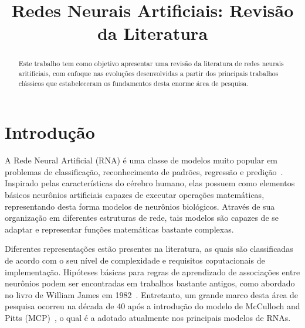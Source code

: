 \documentclass[conference]{IEEEtran}
\begin{document}
	
	\title{Redes Neurais Artificiais: Revisão da Literatura}
	
	
	\author{
		}
	
	
	
	\maketitle
	
	\begin{abstract}
		Este trabalho tem como objetivo apresentar uma revisão da literatura de redes neurais aritificiais, com enfoque nas evoluções desenvolvidas a partir dos principais trabalhos clássicos que estabeleceram os fundamentos desta enorme área de pesquisa. 
	\end{abstract}

	\section{Introdução}
	A Rede Neural Artificial (RNA) é uma classe de modelos muito popular em problemas de classificação, reconhecimento de padrões, regressão e predição~\cite{jain1996artificial}. Inspirado pelas características do cérebro humano, elas possuem como elementos básicos neurônios artificiais capazes de executar operações matemáticas, representando desta forma modelos de neurônios biológicos. Através de sua organização em diferentes estruturas de rede, tais modelos são capazes de se adaptar e representar funções matemáticas bastante complexas. 
	
	Diferentes representações estão presentes na literatura, as quais são classificadas de acordo com o seu nível de complexidade e requisitos coputacionais de implementação. Hipóteses básicas para regras de aprendizado de associações entre neurônios podem ser encontradas em trabalhos bastante antigos, como abordado no livro de William James em 1982~\cite{james1984psychology}. Entretanto, um grande marco desta área de pesquisa ocorreu na década de 40 após a introdução do modelo de McCulloch and Pitts (MCP)~\cite{mcculloch1943logical}, o qual é a adotado atualmente nos principais modelos de RNAs.
	
\end{document}
